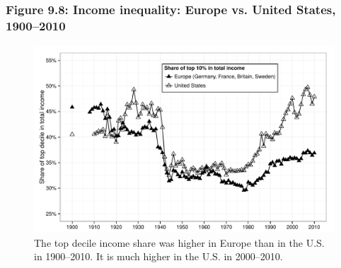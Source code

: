 \documentclass[t]{beamer}\usepackage[]{graphicx}\usepackage[]{color}
\newenvironment{knitrout}{}{} %
\begin{document}
\begin{frame}[label=Figure_9_8]
\frametitle{Figure 9.8: Income inequality: Europe vs. United States, 1900--2010}
\begin{figure}[t]
\begin{minipage}[b]{\textwidth}
\centering
\begin{knitrout}\footnotesize
{}\color{fgcolor}

{\centering \includegraphics[width=1\linewidth]{figures/bw/Figure_9_8} 

}



\end{knitrout}
\caption{The top decile income share was higher in Europe than in the U.S. in 1900--2010. It is much higher in the U.S. in 2000--2010.}
\end{minipage}
\end{figure}
\end{frame}
\end{document}
